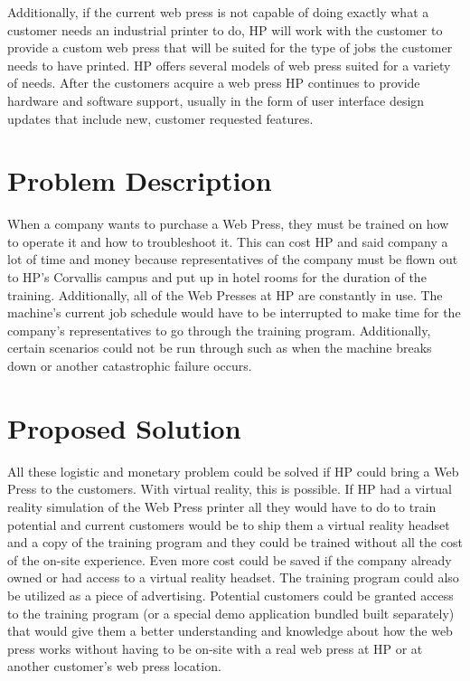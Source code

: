 \documentclass[draftclsnofoot,onecolumn]{IEEEtran}
\begin{document}
Additionally, if the current web press is not capable of doing exactly what a customer needs an industrial printer to do, HP will work with the customer to provide a custom web press that will be suited for the type of jobs the customer needs to have printed. HP offers several models of web press suited for a variety of needs. After the customers acquire a web press HP continues to provide hardware and software support, usually in the form of user interface design updates that include new, customer requested features.

\section{Problem Description}
When a company wants to purchase a Web Press, they must be trained on how to operate it and how to troubleshoot it. This can cost HP and said company a lot of time and money because representatives of the company must be flown out to HP's Corvallis campus and put up in hotel rooms for the duration of the training. Additionally, all of the Web Presses at HP are constantly in use. The machine's current job schedule would have to be interrupted to make time for the company's representatives to go through the training program. Additionally, certain scenarios could not be run through such as when the machine breaks down or another catastrophic failure occurs.

\section{Proposed Solution}
All these logistic and monetary problem could be solved if HP could bring a Web Press to the customers. With virtual reality, this is possible. If HP had a virtual reality simulation of the Web Press printer all they would have to do to train potential and current customers would be to ship them a virtual reality headset and a copy of the training program and they could be trained without all the cost of the on-site experience. Even more cost could be saved if the company already owned or had access to a virtual reality headset. The training program could also be utilized as a piece of advertising. Potential customers could be granted access to the training program  (or a special demo application bundled built separately) that would give them a better understanding and knowledge about how the web press works without having to be on-site with a real web press at HP or at another customer's web press location.
\end{document}
